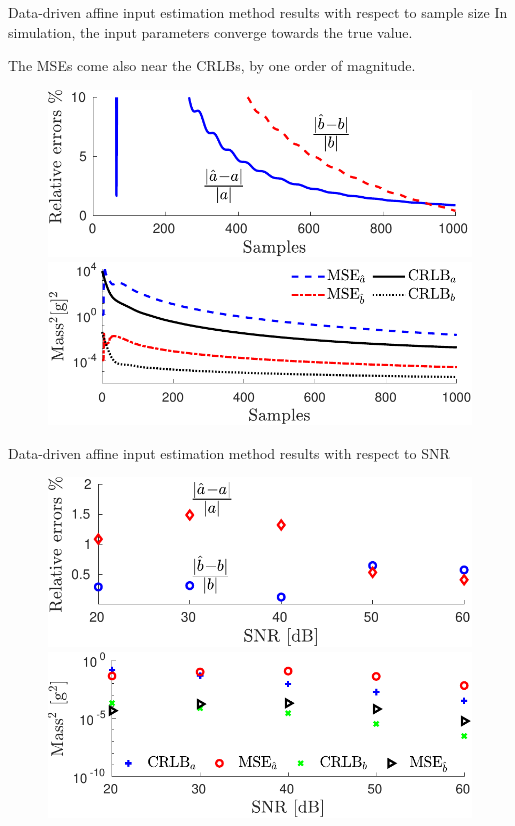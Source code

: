 \documentclass[presentation]{beamer}
\begin{document}
\begin{frame}[label={slide:affine-input-estimation3}]{Data-driven affine input estimation method results with respect to sample size}
In simulation, the input parameters converge towards the true value.

The MSEs come also near the CRLBs, by one order of magnitude. 
\begin{figure}[htb!]
\centering
\includegraphics[width=0.55\columnwidth]{./fig/Aff_Fig_4.pdf} 
\includegraphics[width=0.55\columnwidth]{./fig/Aff_Fig_6.pdf} 
\end{figure}
\end{frame}

\begin{frame}[label={slide:affine-input-estimation4}]{Data-driven affine input estimation method results with respect to SNR}
\begin{figure}[htb!]
\centering
\includegraphics[width=0.55\columnwidth]{./fig/Aff_Fig_5.pdf} 
\includegraphics[width=0.55\columnwidth]{./fig/Aff_Fig_7.pdf} 
\end{figure}
\end{frame}
\end{document}
